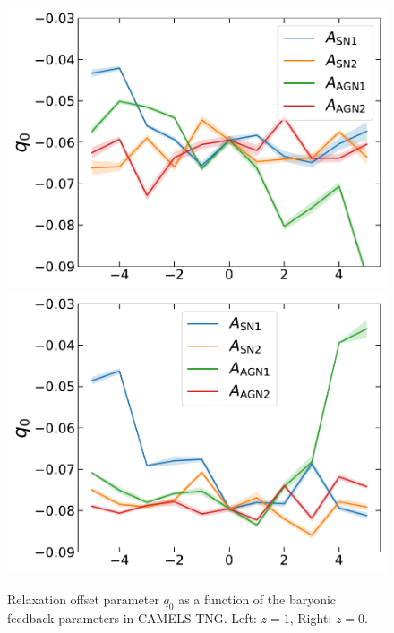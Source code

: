 \begin{figure}[htbp]
\centering
\includegraphics[width=0.49\linewidth]{plots/CAMELS_I_q0_sn18.pdf}
\includegraphics[width=0.49\linewidth]{plots/CAMELS_I_q0_sn33.pdf}
\caption[]{Relaxation offset parameter $q_0$ as a function of the baryonic feedback parameters in CAMELS-TNG. Left: $z=1$, Right: $z=0$.}
\label{fig:camels-q0q1}
\end{figure}









